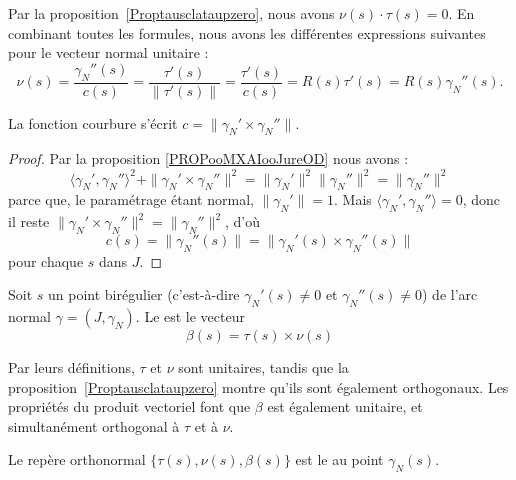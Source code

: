 Par la proposition~\ref{Proptausclataupzero}, nous avons \( \nu(s)\cdot\tau(s)=0\). En combinant toutes les formules, nous avons les différentes expressions suivantes pour le vecteur normal unitaire :
\begin{equation}        \label{Eq0908nufractauRc}
	\nu(s)=\frac{ \gamma_N''(s) }{ c(s) }=\frac{ \tau'(s) }{ \| \tau'(s) \| }=\frac{ \tau'(s) }{ c(s) }=R(s)\tau'(s)=R(s)\gamma_N''(s).
\end{equation}

\begin{proposition}
	La fonction courbure s'écrit \( c=\| \gamma_N'\times \gamma_N'' \|\).
\end{proposition}

\begin{proof}
	Par la proposition \ref{PROPooMXAIooJureOD} nous avons :
	\begin{equation}
		\langle \gamma_N', \gamma_N''\rangle^2 + \| \gamma_N'\times \gamma_N'' \|^2=\| \gamma_N' \|^2\| \gamma_N'' \|^2=\| \gamma_N'' \|^2
	\end{equation}
	parce que, le paramétrage étant normal, \( \| \gamma_N' \|=1\). Mais \( \langle \gamma_N', \gamma_N''\rangle =0\), donc il reste \( \| \gamma_N'\times \gamma_N'' \|^2=\| \gamma_N'' \|^2\), d'où
	\begin{equation}        \label{Eqcsnormgpgpps}
		c(s)=\| \gamma_N''(s) \|=\| \gamma_N'(s)\times \gamma_N''(s) \|
	\end{equation}
	pour chaque \( s\) dans \( J\).
\end{proof}

\begin{definition}
	Soit \( s\) un point birégulier (c'est-à-dire \( \gamma_N'(s)\neq 0\) et \( \gamma_N''(s)\neq 0\)) de l'arc normal \( \gamma=(J,\gamma_N)\). Le  est le vecteur
	\begin{equation}
		\beta(s)=\tau(s)\times\nu(s)
	\end{equation}
\end{definition}

Par leurs définitions, \( \tau\) et \( \nu\) sont unitaires, tandis que la proposition~\ref{Proptausclataupzero} montre qu'ils sont également orthogonaux. Les propriétés du produit vectoriel font que \( \beta\) est également unitaire, et simultanément orthogonal à \( \tau\) et à \( \nu\).

\begin{definition}
	Le repère orthonormal \( \{ \tau(s), \nu(s),\beta(s) \}\) est le  au point \( \gamma_N(s)\).
\end{definition}

